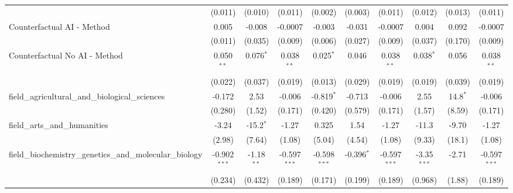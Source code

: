 \begin{tabular}{lccccccccc}
                                                               & (0.011)        & (0.010)       & (0.011)        & (0.002)        & (0.003)      & (0.011)        & (0.012)        & (0.013)       & (0.011)\\   
   Counterfactual AI - Method                                  & 0.005          & -0.008        & -0.0007        & -0.003         & -0.031       & -0.0007        & 0.004          & 0.092         & -0.0007\\   
                                                               & (0.011)        & (0.035)       & (0.009)        & (0.006)        & (0.027)      & (0.009)        & (0.037)        & (0.170)       & (0.009)\\   
   Counterfactual No AI - Method                               & 0.050$^{**}$   & 0.076$^{*}$   & 0.038$^{**}$   & 0.025$^{*}$    & 0.046        & 0.038$^{**}$   & 0.038$^{*}$    & 0.056         & 0.038$^{**}$\\   
                                                               & (0.022)        & (0.037)       & (0.019)        & (0.013)        & (0.029)      & (0.019)        & (0.019)        & (0.039)       & (0.019)\\   
   field\_agricultural\_and\_biological\_sciences              & -0.172         & 2.53          & -0.006         & -0.819$^{*}$   & -0.713       & -0.006         & 2.55           & 14.8$^{*}$    & -0.006\\   
                                                               & (0.280)        & (1.52)        & (0.171)        & (0.420)        & (0.579)      & (0.171)        & (1.57)         & (8.59)        & (0.171)\\   
   field\_arts\_and\_humanities                                & -3.24          & -15.2$^{*}$   & -1.27          & 0.325          & 1.54         & -1.27          & -11.3          & -9.70         & -1.27\\   
                                                               & (2.98)         & (7.64)        & (1.08)         & (5.04)         & (4.54)       & (1.08)         & (9.33)         & (18.1)        & (1.08)\\   
   field\_biochemistry\_genetics\_and\_molecular\_biology      & -0.902$^{***}$ & -1.18$^{**}$  & -0.597$^{***}$ & -0.598$^{***}$ & -0.396$^{*}$ & -0.597$^{***}$ & -3.35$^{***}$  & -2.71         & -0.597$^{***}$\\   
                                                               & (0.234)        & (0.432)       & (0.189)        & (0.171)        & (0.199)      & (0.189)        & (0.968)        & (1.88)        & (0.189)\\   

\end{tabular}
